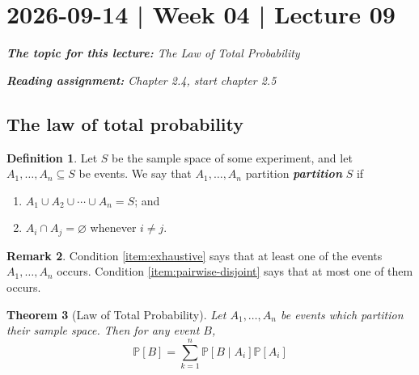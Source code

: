 \documentclass[10pt]{article}
\newtheorem{theorem}{Theorem}
\theoremstyle{definition}
\newtheorem{definition}[theorem]{Definition}
\newtheorem{remark}[theorem]{Remark}
\newcommand{\1}[1]{\textbf{1}_{\left[#1\right]}} %
\def\P{\mathbb{P}} %
\DeclareRobustCommand{\demph}[1]{%
  \ifmmode
  {\color{Blue}#1}%
  \else
  {\color{Blue}\bfseries\slshape #1}%
  \fi
}
\begin{document}
\section{2026-09-14 | Week 04 | Lecture 09}
\begin{center}
  \begin{tcolorbox}[width=0.9\textwidth, colback=white, colframe=black]
    \textit{\textbf{The topic for this lecture:} The Law of Total Probability}

    \textit{\textbf{Reading assignment:} Chapter 2.4, start chapter 2.5}
  \end{tcolorbox}
\end{center}


\subsection{The law of total probability}
\begin{definition}
  Let $S$ be the sample space of some experiment, and let
  $A_{1},\ldots,A_{n}\subseteq S$ be events. We say that $A_{1},\ldots,A_{n}$
  \demph{partition} $S$ if
  \begin{enumerate}[label=(\roman*)]
    \item \label{item:exhaustive} $A_{1}\cup A_{2}\cup\cdots\cup A_{n} =S$; and 
    \item \label{item:pairwise-disjoint} $A_{i}\cap A_{j}=\varnothing$ whenever $i\neq j$.
  \end{enumerate}
\end{definition}
\begin{remark}
  Condition \ref{item:exhaustive} says that at least one of the events
  $A_{1},\ldots,A_{n}$ occurs. Condition \ref{item:pairwise-disjoint} says
  that at most one of them occurs.
\end{remark}

\begin{theorem}[Law of Total Probability]
  \label{thm:law-total-probability}
  Let $A_{1},\ldots,A_{n}$ be events which partition their sample space. Then
  for any event $B$,
  \begin{equation*}
    \P\left[B \right] = \sum_{k=1}^{n}\P\left[B\mid A_{i} \right]\P\left[A_{i} \right] 
  \end{equation*}
\end{theorem}
\end{document}
